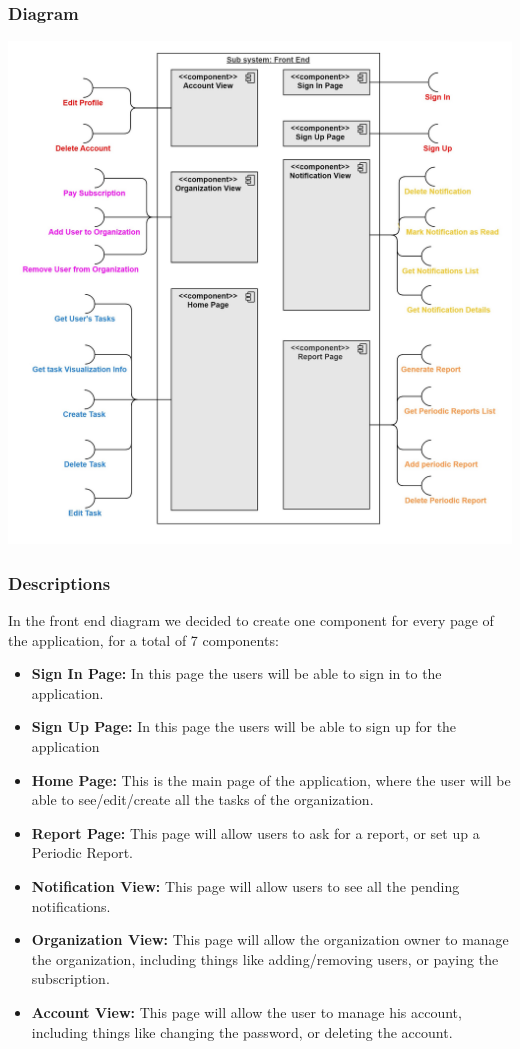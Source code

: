 \documentclass{article}
\begin{document}
\subsubsection{Diagram}
\includegraphics[width=\textwidth,height=\textheight,keepaspectratio]{images/component_diagram/front_end.jpg}
\subsubsection{Descriptions}
In the front end diagram we decided to create one component for every page of the application, for a total of 7 components:
\begin{itemize}
    \item \textbf{Sign In Page: } In this page the users will be able to sign in to the application.
    \item \textbf{Sign Up Page: } In this page the users will be able to sign up for the application
    \item \textbf{Home Page: } This is the main page of the application, where the user will be able to see/edit/create all the tasks of the organization.
    \item \textbf{Report Page: } This page will allow users to ask for a report, or set up a Periodic Report.
    \item \textbf{Notification View: } This page will allow users to see all the pending notifications.
    \item \textbf{Organization View: } This page will allow the organization owner to manage the organization, including things like adding/removing users, or paying the subscription.
    \item \textbf{Account View: } This page will allow the user to manage his account, including things like changing the password, or deleting the account.
\end{itemize}
\end{document}
